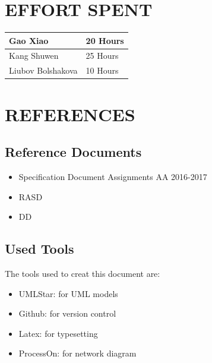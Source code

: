 \documentclass[a4paper,11pt]{article}
\begin{document}
\section{EFFORT SPENT}

\renewcommand\arraystretch{2}
\begin{tabular}{| p{5cm}| p{7cm}|}
 \hline
Gao Xiao& 20 Hours \\
 \hline
Kang Shuwen& 25 Hours \\
 \hline
Liubov Bolshakova& 10 Hours \\
 \hline

\end{tabular}

\newpage
\section{REFERENCES}
	\subsection{Reference Documents}
	\begin{itemize}
		\item Specification Document Assignments AA 2016-2017
		\item RASD
		\item DD
	\end{itemize}
	\subsection{Used Tools}
	The tools used to creat this document are:
	\begin{itemize}
		\item UMLStar: for UML models
		\item Github: for version control
		\item Latex: for typesetting
		\item ProcessOn: for network diagram
		 
	\end{itemize}

\newpage
	
\end{document}
